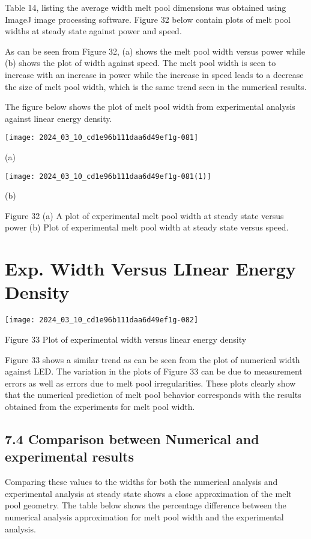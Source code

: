 \documentclass[10pt]{article}
\begin{document}
Table 14, listing the average width melt pool dimensions was obtained using ImageJ image processing software. Figure 32 below contain plots of melt pool widths at steady state against power and speed.

As can be seen from Figure 32, (a) shows the melt pool width versus power while (b) shows the plot of width against speed. The melt pool width is seen to increase with an increase in power while the increase in speed leads to a decrease the size of melt pool width, which is the same trend seen in the numerical results.

The figure below shows the plot of melt pool width from experimental analysis against linear energy density.

\begin{center}
\texttt{[image: 2024\_03\_10\_cd1e96b111daa6d49ef1g-081]}
\end{center}

(a)

\begin{center}
\texttt{[image: 2024\_03\_10\_cd1e96b111daa6d49ef1g-081(1)]}
\end{center}

(b)

Figure 32 (a) A plot of experimental melt pool width at steady state versus power (b) Plot of experimental melt pool width at steady state versus speed.

\section*{Exp. Width Versus LInear Energy Density}
\begin{center}
\texttt{[image: 2024\_03\_10\_cd1e96b111daa6d49ef1g-082]}
\end{center}

Figure 33 Plot of experimental width versus linear energy density

Figure 33 shows a similar trend as can be seen from the plot of numerical width against LED. The variation in the plots of Figure 33 can be due to measurement errors as well as errors due to melt pool irregularities. These plots clearly show that the numerical prediction of melt pool behavior corresponds with the results obtained from the experiments for melt pool width.

\subsection*{7.4 Comparison between Numerical and experimental results}
Comparing these values to the widths for both the numerical analysis and experimental analysis at steady state shows a close approximation of the melt pool geometry. The table below shows the percentage difference between the numerical analysis approximation for melt pool width and the experimental analysis.
\end{document}

